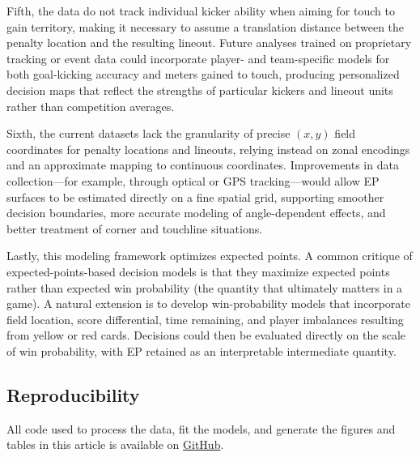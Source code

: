 \documentclass[12pt]{article}
\begin{document}
Fifth, the data do not track individual kicker ability when aiming for touch to gain territory, making it necessary to assume a translation distance between the penalty location and the resulting lineout. Future analyses trained on proprietary tracking or event data could incorporate player- and team-specific models for both goal-kicking accuracy and meters gained to touch, producing personalized decision maps that reflect the strengths of particular kickers and lineout units rather than competition averages.

Sixth, the current datasets lack the granularity of precise $(x, y)$ field coordinates for penalty locations and lineouts, relying instead on zonal encodings and an approximate mapping to continuous coordinates. Improvements in data collection---for example, through optical or GPS tracking---would allow EP surfaces to be estimated directly on a fine spatial grid, supporting smoother decision boundaries, more accurate modeling of angle-dependent effects, and better treatment of corner and touchline situations.

Lastly, this modeling framework optimizes expected points. A common critique of expected-points-based decision models is that they maximize expected points rather than expected win probability (the quantity that ultimately matters in a game). A natural extension is to develop win-probability models that incorporate field location, score differential, time remaining, and player imbalances resulting from yellow or red cards. Decisions could then be evaluated directly on the scale of win probability, with EP retained as an interpretable intermediate quantity.

\subsection{Reproducibility}

All code used to process the data, fit the models, and generate the figures and tables in this article is available on \href{https://github.com/WhartonSABI/rugby-ep}{GitHub}.



\end{document}
